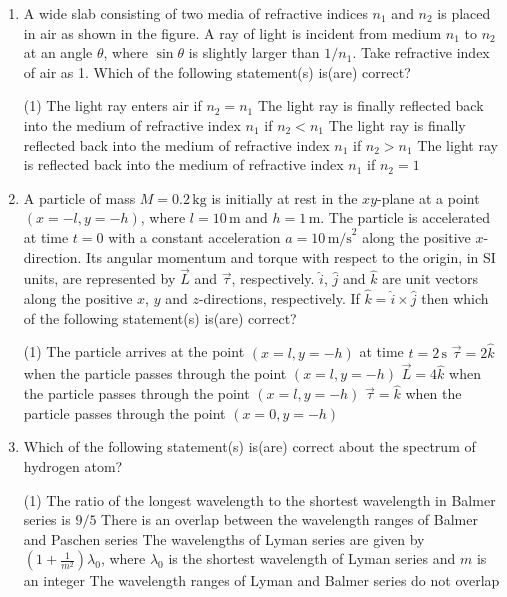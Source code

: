 \documentclass{article}
\begin{document}
\begin{enumerate}
    \item A wide slab consisting of two media of refractive indices $n_1$ and $n_2$ is placed in air as shown in the figure. A ray of light is incident from medium $n_1$ to $n_2$ at an angle $\theta$, where $\sin \theta$ is slightly larger than $1/n_1$. Take refractive index of air as 1. Which of the following statement(s) is(are) correct?
        \begin{tasks}(1)
            	\task The light ray enters air if $n_2 = n_1$
            	\task The light ray is finally reflected back into the medium of refractive index $n_1$ if $n_2 < n_1$
            	\task The light ray is finally reflected back into the medium of refractive index $n_1$ if $n_2 > n_1$
            	\task The light ray is reflected back into the medium of refractive index $n_1$ if $n_2 = 1$
        \end{tasks}

    \item A particle of mass $M = 0.2 \, \text{kg}$ is initially at rest in the $xy$-plane at a point $(x = -l, y = -h)$, where $l = 10 \, \text{m}$ and $h = 1 \, \text{m}$. The particle is accelerated at time $t = 0$ with a constant acceleration $a = 10 \, \text{m/s}^2$ along the positive $x$-direction. Its angular momentum and torque with respect to the origin, in SI units, are represented by $\vec{L}$ and $\vec{\tau}$, respectively. $\hat{i}$, $\hat{j}$ and $\hat{k}$ are unit vectors along the positive $x$, $y$ and $z$-directions, respectively. If $\hat{k} = \hat{i} \times \hat{j}$ then which of the following statement(s) is(are) correct?
        \begin{tasks}(1)
            	\task The particle arrives at the point $(x = l, y = -h)$ at time $t = 2 \, \text{s}$
            	\task $\vec{\tau} = 2 \hat{k}$ when the particle passes through the point $(x = l, y = -h)$
            	\task $\vec{L} = 4 \hat{k}$ when the particle passes through the point $(x = l, y = -h)$
            	\task $\vec{\tau} = \hat{k}$ when the particle passes through the point $(x = 0, y = -h)$
        \end{tasks}

    \item Which of the following statement(s) is(are) correct about the spectrum of hydrogen atom?
        \begin{tasks}(1)
            	\task The ratio of the longest wavelength to the shortest wavelength in Balmer series is $9/5$
            	\task There is an overlap between the wavelength ranges of Balmer and Paschen series
            	\task The wavelengths of Lyman series are given by $(1 + \frac{1}{m^2})\lambda_0$, where $\lambda_0$ is the shortest wavelength of Lyman series and $m$ is an integer
            	\task The wavelength ranges of Lyman and Balmer series do not overlap
        \end{tasks}



\end{enumerate}
\end{document}
